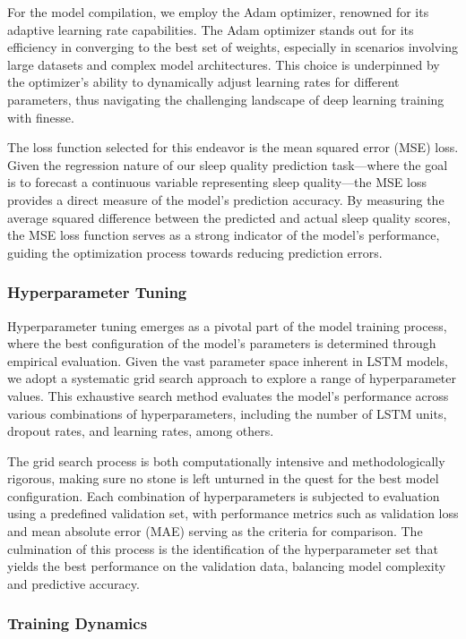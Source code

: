 \documentclass[10pt]{extarticle}
\begin{document}
For the model compilation, we employ the Adam optimizer, renowned for its adaptive learning rate capabilities. The Adam optimizer stands out for its efficiency in converging to the best set of weights, especially in scenarios involving large datasets and complex model architectures. This choice is underpinned by the optimizer's ability to dynamically adjust learning rates for different parameters, thus navigating the challenging landscape of deep learning training with finesse.

The loss function selected for this endeavor is the mean squared error (MSE) loss. Given the regression nature of our sleep quality prediction task—where the goal is to forecast a continuous variable representing sleep quality---the MSE loss provides a direct measure of the model's prediction accuracy. By measuring the average squared difference between the predicted and actual sleep quality scores, the MSE loss function serves as a strong indicator of the model's performance, guiding the optimization process towards reducing prediction errors.

\subsubsection{Hyperparameter Tuning}

Hyperparameter tuning emerges as a pivotal part of the model training process, where the best configuration of the model's parameters is determined through empirical evaluation. Given the vast parameter space inherent in LSTM models, we adopt a systematic grid search approach to explore a range of hyperparameter values. This exhaustive search method evaluates the model's performance across various combinations of hyperparameters, including the number of LSTM units, dropout rates, and learning rates, among others.

The grid search process is both computationally intensive and methodologically rigorous, making sure no stone is left unturned in the quest for the best model configuration. Each combination of hyperparameters is subjected to evaluation using a predefined validation set, with performance metrics such as validation loss and mean absolute error (MAE) serving as the criteria for comparison. The culmination of this process is the identification of the hyperparameter set that yields the best performance on the validation data, balancing model complexity and predictive accuracy.

\subsubsection{Training Dynamics}
\end{document}
